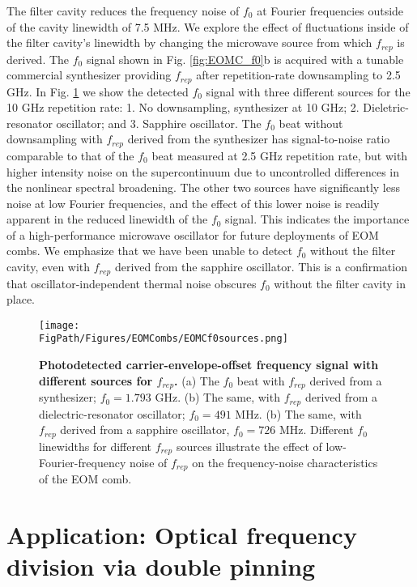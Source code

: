 The filter cavity reduces the frequency noise of $f_0$ at Fourier frequencies outside of the cavity linewidth of 7.5 MHz. We explore the effect of fluctuations inside of the filter cavity's linewidth by changing the microwave source from which $f_{rep}$ is derived. The $f_0$ signal shown in Fig. \ref{fig:EOMC_f0}b is acquired with a tunable commercial synthesizer providing $f_{rep}$ after repetition-rate downsampling to 2.5 GHz. In Fig. \ref{fig:EOMC_f0_sources} we show the detected $f_0$ signal with three different sources for the 10 GHz repetition rate: 1. No downsampling, synthesizer at 10 GHz; 2. Dieletric-resonator oscillator; and 3. Sapphire oscillator. The $f_0$ beat without downsampling with $f_{rep}$ derived from the synthesizer has signal-to-noise ratio comparable to that of the $f_0$ beat measured at 2.5 GHz repetition rate, but with higher intensity noise on the supercontinuum due to uncontrolled differences in the nonlinear spectral broadening. The other two sources have significantly less noise at low Fourier frequencies, and the effect of this lower noise is readily apparent in the reduced linewidth of the $f_0$ signal. This indicates the importance of a high-performance microwave oscillator for future deployments of EOM combs. We emphasize that we have been unable to detect $f_0$ without the filter cavity, even with $f_{rep}$ derived from the sapphire oscillator. This is a confirmation that oscillator-independent thermal noise obscures $f_0$ without the filter cavity in place.



\begin{figure}[htpb]
	\begin{center}
		\texttt{[image: \\FigPath/Figures/EOMCombs/EOMCf0sources.png]}
	\end{center}
	\caption[Photodetected carrier-envelope-offset frequency signal with different sources for $f_{rep}$]{\textbf{Photodetected carrier-envelope-offset frequency signal with different sources for $f_{rep}$.} (a) The $f_0$ beat with $f_{rep}$ derived from a synthesizer; $f_0=1.793$ GHz. (b) The same, with $f_{rep}$ derived from a dielectric-resonator oscillator; $f_0=491$ MHz. (b) The same, with $f_{rep}$ derived from a sapphire oscillator, $f_0=726$ MHz. Different $f_0$ linewidths for different $f_{rep}$ sources illustrate the effect of low-Fourier-frequency noise of $f_{rep}$ on the frequency-noise characteristics of the EOM comb.}
	\label{fig:EOMC_f0_sources}
\end{figure} 

\section{Application: Optical frequency division via double pinning}


